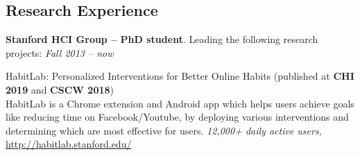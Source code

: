 \documentclass[margin,line]{resume}
\begin{document}
\begin{resume}

\vspace{-3mm}

\section{\mysidestyle Research Experience}

\textbf{Stanford HCI Group -- PhD student}. Leading the following research projects: \hfill \textsl{Fall 2013 -- now}

\vspace{-2mm}

HabitLab: Personalized Interventions for Better Online Habits (published at \textbf{CHI 2019} and \textbf{CSCW 2018})\\
HabitLab is a Chrome extension and Android app which helps users achieve goals like reducing time on Facebook/Youtube, by deploying various interventions and determining which are most effective for users. \emph{12,000+ daily active users,} \url{http://habitlab.stanford.edu/}





\end{resume}
\end{document}
